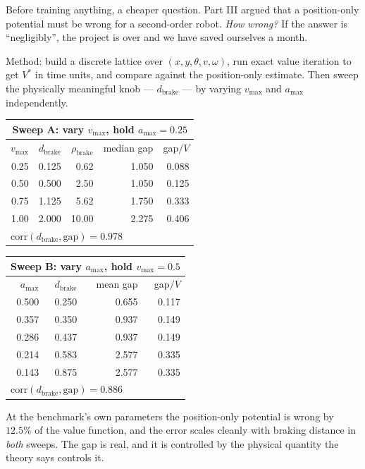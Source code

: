 \documentclass[11pt,a4paper]{article}
\begin{document}
Before training anything, a cheaper question. Part III argued that a position-only potential
must be wrong for a second-order robot. \emph{How wrong?} If the answer is ``negligibly'',
the project is over and we have saved ourselves a month.

Method: build a discrete lattice over $(x,y,\theta,v,\omega)$, run exact value iteration to
get $V^*$ in time units, and compare against the position-only estimate. Then sweep the
physically meaningful knob --- $d_{\text{brake}}$ --- by varying $v_{\max}$ and $a_{\max}$
independently.

\begin{center}
\small
\begin{tabular}{rrrrr}
\multicolumn{5}{c}{\textbf{Sweep A: vary $v_{\max}$, hold $a_{\max}=0.25$}}\\
\toprule
$v_{\max}$ & $d_{\text{brake}}$ & $\rho_{\text{brake}}$ & median gap & gap$/V$ \\
\midrule
0.25 & 0.125 & 0.62  & 1.050 & 0.088 \\
0.50 & 0.500 & 2.50  & 1.050 & 0.125 \\
0.75 & 1.125 & 5.62  & 1.750 & 0.333 \\
1.00 & 2.000 & 10.00 & 2.275 & 0.406 \\
\bottomrule
\multicolumn{5}{l}{\footnotesize $\text{corr}(d_{\text{brake}},\text{gap}) = 0.978$}
\end{tabular}
\qquad
\begin{tabular}{rrrr}
\multicolumn{4}{c}{\textbf{Sweep B: vary $a_{\max}$, hold $v_{\max}=0.5$}}\\
\toprule
$a_{\max}$ & $d_{\text{brake}}$ & mean gap & gap$/V$ \\
\midrule
0.500 & 0.250 & 0.655 & 0.117 \\
0.357 & 0.350 & 0.937 & 0.149 \\
0.286 & 0.437 & 0.937 & 0.149 \\
0.214 & 0.583 & 2.577 & 0.335 \\
0.143 & 0.875 & 2.577 & 0.335 \\
\bottomrule
\multicolumn{4}{l}{\footnotesize $\text{corr}(d_{\text{brake}},\text{gap}) = 0.886$}
\end{tabular}
\end{center}

At the benchmark's own parameters the position-only potential is wrong by $12.5\%$ of the
value function, and the error scales cleanly with braking distance in \emph{both} sweeps.
The gap is real, and it is controlled by the physical quantity the theory says controls it.
\end{document}
